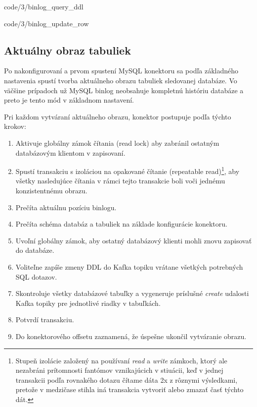 
            {code/3/binlog_query_ddl}


            {code/3/binlog_update_row}
            
\subsection{Aktuálny obraz tabuliek} \label{debezium:conistent_snapshot}
Po nakonfigurovaní a prvom spustení MySQL konektoru sa podľa základného nastavenia spustí tvorba aktuálneho obrazu tabuliek sledovanej databáze. Vo väčšine prípadoch už MySQL binlog neobsahuje kompletnú históriu databáze a preto je tento mód v základnom nastavení. 

Pri každom vytváraní aktuálneho obrazu, konektor postupuje podľa týchto krokov\cite{debezium:consistent_snapshot}:
\begin{enumerate}
\item Aktivuje globálny zámok čítania (read lock) aby zabránil ostatným databázovým klientom v zapisovaní.
\item Spustí transakciu s izoláciou na opakované čítanie (repeatable read)\footnote{Stupeň izolácie založený na používaní \textit{read} a \textit{write} zámkoch, ktorý ale nezabráni prítomnosti fantómov vznikajúcich v stiuácii, keď v jednej transakcii podľa rovnakého dotazu čítame dáta 2x z rôznymi výsledkami, pretože v medzičase stihla iná transakcia vytvoriť alebo zmazať časť týchto dát.}, aby všetky nasledujúce čítania v rámci tejto transakcie boli voči jednému konzistentnému obrazu.
\item Prečíta aktuálnu pozíciu binlogu.
\item Prečíta schéma databáz a tabuliek na základe konfigurácie konektoru.
\item Uvoľní globálny zámok, aby ostatný databázový klienti mohli znovu zapisovať do databáze.
\item Voliteľne zapíše zmeny DDL do Kafka topiku vrátane všetkých potrebných SQL dotazov.
\item Skontroluje všetky databázové tabuľky a vygeneruje príslušné \textit{create} udalosti  Kafka topiky pre jednotlivé riadky v tabuľkách.
\item Potvrdí transakciu.
\item Do konektorového offsetu zaznamená, že úspešne ukončil vytváranie obrazu.
\end{enumerate}

